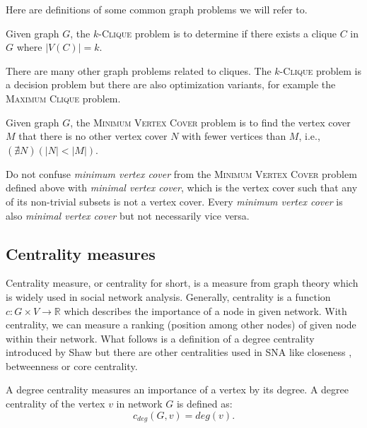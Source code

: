 Here are definitions of some common \NPh graph problems we will refer to.

\begin{definition}
    Given graph $G$, the $k$-\textsc{Clique} problem is to determine if
    there exists a clique $C$ in $G$ where $|V(C)| = k$.
\end{definition}
There are many other graph problems related to cliques. The $k$-\textsc{Clique} problem is a decision problem but
there are also optimization variants, for example the \textsc{Maximum Clique} problem.

\begin{definition}
    Given graph $G$, the \textsc{Minimum Vertex Cover} problem is to find
    the vertex cover $M$ that there is no other vertex cover $N$ with fewer vertices than $M$, i.e., 
    $(\nexists N)(|N| < |M|)$.
\end{definition}
Do not confuse \emph{minimum vertex cover} from the \textsc{Minimum Vertex Cover} problem defined above with \emph{minimal vertex cover},
which is the vertex cover such that any of its non-trivial subsets is not a vertex cover.
Every \emph{minimum vertex cover} is also \emph{minimal vertex cover} but not necessarily vice versa.


\subsection{Centrality measures}

Centrality measure, or centrality for short, is a measure from graph theory which is widely used in social network analysis.
Generally, centrality is a function $c: G \times V \rightarrow \mathbb{R}$ which describes the importance of a node in given network.
With centrality, we can measure a ranking (position among other nodes) of given node within their network.
What follows is a definition of a degree centrality introduced by Shaw \cite{Shaw1954} but there are other centralities used in SNA like
closeness \cite{Beauchamp1965}, betweenness \cite{Anthonisse1971,Freeman1977} or core \cite{Seidman1983} centrality.

\begin{definition}
    A degree centrality measures an importance of a vertex by its degree.
    A degree centrality of the vertex $v$ in network $G$ is defined as:
    $$c_{deg}(G, v) = deg(v).$$
\end{definition}


